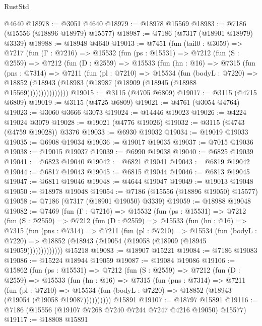 \begin{lexlean}{RustStd}
\begin{coremodule}
    @4640
@18978 := @3051 @4640
@18979 := @18978 @15569
@18983 := @7186 (@15556 (@18896 @18979) @15577)
@18987 := @7186 (@7317 (@18901 @18979) @3339)
@18988 := @18948 @4640
@19013 := @7451
    (fun (tail0 : @3059) =>
    @7217
      (fun (Γ : @7216) =>
      @15532
        (fun (ps : @15531) =>
        @7212
          (fun (S : @2559) =>
          @7212
            (fun (D : @2559) =>
            @15533
              (fun (hn : @16) =>
              @7315
                (fun (pns : @7314) =>
                @7211
                  (fun (pl : @7210) =>
                  @15534
                    (fun (bodyL : @7220) =>
                    @18852 (@18943 (@18983 (@18987 (@18909 (@18945 (@18988 @15569)))))))))))))))
@19015 := @3115 (@4705 @6809)
@19017 := @3115 (@4715 @6809)
@19019 := @3115 (@4725 @6809)
@19021 := @4761 (@3054 @4764)
@19023 := @3060 @3666 @3073
@19024 := @14446 @19023
@19026 := @4224 @19024 @3079
@19028 := @19021 (@4776 @19026)
@19032 := @3115 (@4743 (@4759 @19028)) @3376
@19033 := @6930 @19032
@19034 := @19019 @19033
@19035 := @6908 @19034
@19036 := @19017 @19035
@19037 := @7015 @19036
@19038 := @19015 @19037
@19039 := @6990 @19038
@19040 := @6825 @19039
@19041 := @6823 @19040
@19042 := @6821 @19041
@19043 := @6819 @19042
@19044 := @6817 @19043
@19045 := @6815 @19044
@19046 := @6813 @19045
@19047 := @6811 @19046
@19048 := @4644 @19047
@19049 := @19013 @19048
@19050 := @18978 @19048
@19054 := @7186 (@15556 (@18896 @19050) @15577)
@19058 := @7186 (@7317 (@18901 @19050) @3339)
@19059 := @18988 @19048
@19082 := @7469
    (fun (Γ : @7216) =>
    @15532
      (fun (ps : @15531) =>
      @7212
        (fun (S : @2559) =>
        @7212
          (fun (D : @2559) =>
          @15533
            (fun (hn : @16) =>
            @7315
              (fun (pns : @7314) =>
              @7211
                (fun (pl : @7210) =>
                @15534
                  (fun (bodyL : @7220) =>
                  @18852 (@18943 (@19054 (@19058 (@18909 (@18945 @19059)))))))))))))
    @15218
@19083 := @18907 @15221
@19084 := @7186 @19083
@19086 := @15224 @18944 @19059
@19087 := @19084 @19086
@19106 := @15862
    (fun (ps : @15531) =>
    @7212
      (fun (S : @2559) =>
      @7212
        (fun (D : @2559) =>
        @15533
          (fun (hn : @16) =>
          @7315
            (fun (pns : @7314) =>
            @7211
              (fun (pl : @7210) =>
              @15534 (fun (bodyL : @7220) => @18852 (@18943 (@19054 (@19058 @19087))))))))))
    @15891
@19107 := @18797 @15891
@19116 := @7186 (@15556 (@19107 @7268 @7240 @7244 @7247 @4216 @19050) @15577)
@19117 := @18808 @15891

\end{coremodule}
\end{lexlean}
